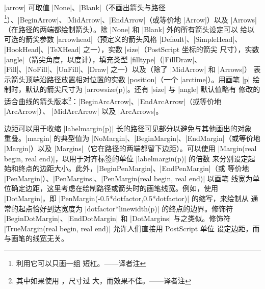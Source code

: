 \documentclass{ctexbook}
\newcommand*\prgname[1]{\textsf{#1}}
\newcommand\transnote[1]{\footnote{#1——译者注}}
\begin{document}
|arrow| 可取值 |None|、|Blank|（不画出箭头与路径\transnote{利用它可以只画一组
短杠。}）、|BeginArrow|、|MidArrow|、|EndArrow|（或等价地 |Arrow|）以及
|Arrows|（在路径的两端都绘制箭头）。除 |None| 和 |Blank| 外的所有箭头设定可以
给以可选的箭尖参数 |arrowhead|（预定义的箭头风格 |Default|、|SimpleHead|、
|HookHead|、|TeXHead| 之一），实数 |size|（\prgname{PostScript} 坐标的箭尖
尺寸），实数 |angle|（箭尖角度，以度计），填充类型 |filltype|（|FillDraw|、
|Fill|、|NoFill|、|UnFill|、|Draw| 之一）以及（除了 |MidArrow| 和 |Arrows|）
表示箭头顶端沿路径放置相对位置的实数 |position|（一个 |arctime|）。用画笔 |p|
绘制时，默认的箭尖尺寸为 |arrowsize(p)|。还有 |size| 与 |angle| 默认值略有
修改的适合曲线的箭头版本\transnote{其中如果使用 ，尺寸过
大，而效果不佳。}：|BeginArcArrow|、|EndArcArrow|（或等价地 |ArcArrow|）、
|MidArcArrow| 以及 |ArcArrows|。

边距可以用于收缩 |labelmargin(p)| 长的路径可见部分以避免与其他画出的对象
重叠。|margin| 的典型值为 |NoMargin|、|BeginMargin|、|EndMargin|（或等价地
|Margin|）以及 |Margins|（它在路径的两端都留下边距）。可以使用
|Margin(real begin, real end)|，以用于对齐标签的单位 |labelmargin(p)| 的倍数
来分别设定起始和终点的边距大小。此外，|BeginPenMargin|、|EndPenMargin|（或
等价地 |PenMargin|）、|PenMargins|、|PenMargin(real begin, real end)| 以画笔
线宽为单位确定边距，这里考虑在绘制路径或箭头时的画笔线宽。例如，使用
|DotMargin|，即 |PenMargin(-0.5*dotfactor,0.5*dotfactor)| 的缩写，来绘制从
通常的起点恰好到达宽度为 |dotfactor*linewidth(p)| 的终点的边界。修饰符
|BeginDotMargin|、|EndDotMargin| 和 |DotMargins| 与之类似。修饰符
|TrueMargin(real begin, real end)| 允许人们直接用 \prgname{PostScript} 单位
设定边距，而与画笔的线宽无关。
\end{document}
